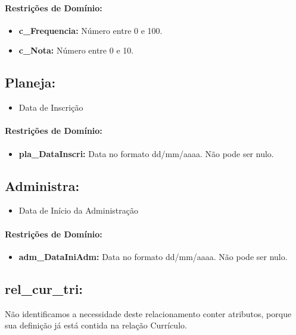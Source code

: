 \documentclass{report}
\begin{document}
\paragraph{Restrições de Domínio:}
\begin{itemize}
  \item \textbf{c\_Frequencia:} Número entre 0 e 100.
  \item \textbf{c\_Nota:} Número entre 0 e 10.
\end{itemize}
\subsection{Planeja:}
\begin{itemize}
  \item Data de Inscrição
\end{itemize}
\paragraph{Restrições de Domínio:}
\begin{itemize}
  \item \textbf{pla\_DataInscri:} Data no formato dd/mm/aaaa. Não pode ser nulo.
\end{itemize}
\subsection{Administra:}
\begin{itemize}
  \item Data de Início da Administração
\end{itemize}
\paragraph{Restrições de Domínio:}
\begin{itemize}
  \item \textbf{adm\_DataIniAdm:} Data no formato dd/mm/aaaa. Não pode ser nulo.
\end{itemize}
\subsection{rel\_cur\_tri:}
 Não identificamos a necessidade deste relacionamento conter atributos, porque
 sua definição já está contida na relação Currículo.
\end{document}
